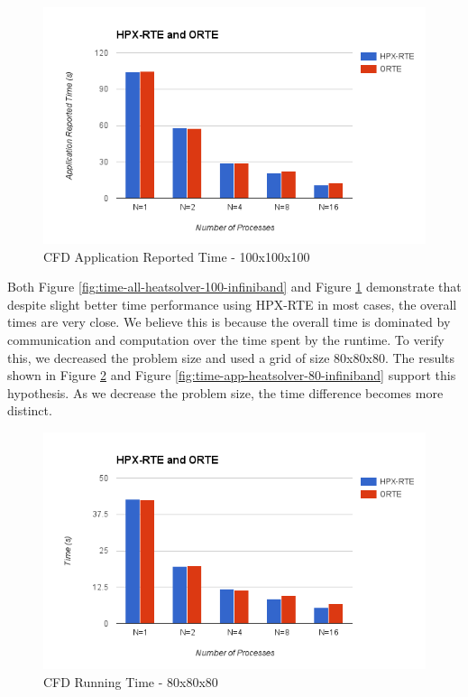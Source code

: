 \begin{figure}[h!]
  \centering
  \includegraphics[scale=0.7]{images/time-app-heatsolver-100-infiniband.png}
  \caption[CFD Application Reported Time - 100x100x100]{CFD Application Reported Time - 100x100x100}
  \label{fig:time-app-heatsolver-100-infiniband}
\end{figure}

Both Figure \ref{fig:time-all-heatsolver-100-infiniband} and Figure \ref{fig:time-app-heatsolver-100-infiniband} demonstrate that despite slight better time performance using HPX-RTE in most cases, the overall times are very close. We believe this is because the overall time is dominated by communication and computation over the time spent by the runtime. To verify this, we decreased the problem size and used a grid of size 80x80x80. The results shown in Figure \ref{fig:time-all-heatsolver-80-infiniband} and Figure \ref{fig:time-app-heatsolver-80-infiniband} support this hypothesis. As we decrease the problem size, the time difference becomes more distinct.


\begin{figure}[h!]
  \centering
  \includegraphics[scale=0.7]{images/time-all-heatsolver-80-infiniband.png}
  \caption[CFD Running Time - 80x80x80]{CFD Running Time - 80x80x80}
  \label{fig:time-all-heatsolver-80-infiniband}
\end{figure}

